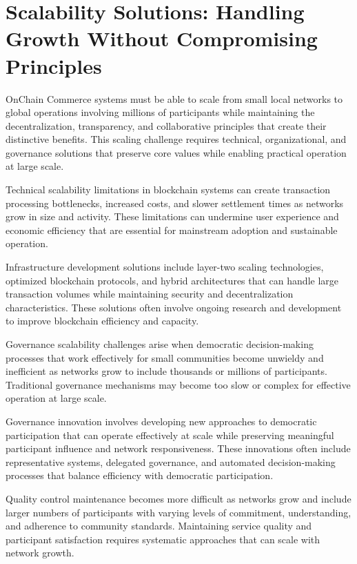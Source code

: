\documentclass[
  Letterpaper,
]{scrbook}
\begin{document}
\section{Scalability Solutions: Handling Growth Without Compromising
Principles}\label{scalability-solutions-handling-growth-without-compromising-principles}

OnChain Commerce systems must be able to scale from small local networks
to global operations involving millions of participants while
maintaining the decentralization, transparency, and collaborative
principles that create their distinctive benefits. This scaling
challenge requires technical, organizational, and governance solutions
that preserve core values while enabling practical operation at large
scale.

Technical scalability limitations in blockchain systems can create
transaction processing bottlenecks, increased costs, and slower
settlement times as networks grow in size and activity. These
limitations can undermine user experience and economic efficiency that
are essential for mainstream adoption and sustainable operation.

Infrastructure development solutions include layer-two scaling
technologies, optimized blockchain protocols, and hybrid architectures
that can handle large transaction volumes while maintaining security and
decentralization characteristics. These solutions often involve ongoing
research and development to improve blockchain efficiency and capacity.

Governance scalability challenges arise when democratic decision-making
processes that work effectively for small communities become unwieldy
and inefficient as networks grow to include thousands or millions of
participants. Traditional governance mechanisms may become too slow or
complex for effective operation at large scale.

Governance innovation involves developing new approaches to democratic
participation that can operate effectively at scale while preserving
meaningful participant influence and network responsiveness. These
innovations often include representative systems, delegated governance,
and automated decision-making processes that balance efficiency with
democratic participation.

Quality control maintenance becomes more difficult as networks grow and
include larger numbers of participants with varying levels of
commitment, understanding, and adherence to community standards.
Maintaining service quality and participant satisfaction requires
systematic approaches that can scale with network growth.
\end{document}
